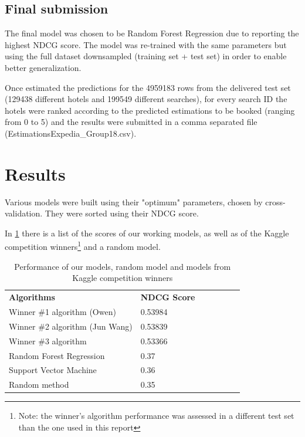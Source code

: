\documentclass[9pt]{llncs}
\begin{document}
\subsection{Final submission}
The final model was chosen to be Random Forest Regression due to reporting the highest NDCG score. The model was re-trained with the same parameters but using the full dataset downsampled (training set + test set) in order to enable better generalization.


Once estimated the predictions for the 4959183 rows from the delivered test set (129438 different hotels and 199549 different searches), for every search ID the hotels were ranked according to the predicted estimations to be booked (ranging from 0 to 5) and the results were submitted in a comma separated file (EstimationsExpedia\_Group18.csv).

\section{Results}
Various models were built using their "optimum" parameters, chosen by cross-validation. They were sorted using their NDCG score.

In \ref{table_results} there is a list of the scores of our working models, as well as of the Kaggle competition winners\footnote{Note: the winner's algorithm performance was assessed in a different test set than the one used in this report} and a random model.


\begin{table}
\centering
\caption[lala]{Performance of our models, random model and models from Kaggle competition winners\footnotemark[1]}
\begin{tabular}{lllllll}
\hline\noalign{\smallskip}
\textbf{Algorithms} & \textbf{NDCG Score} \\
\noalign{\smallskip}
\hline
\noalign{\smallskip}
Winner $\#$1 algorithm (Owen) \cite{ExpediaHttps://www.kaggle.com/c/expedia-personalized-sort/discussion/6203}& 0.53984\\
Winner $\#$2 algorithm (Jun Wang) \cite{ExpediaHttps://www.kaggle.com/c/expedia-personalized-sort/discussion/6203}& 0.53839\\
Winner $\#$3 algorithm \cite{ExpediaHttps://www.kaggle.com/c/expedia-personalized-sort/discussion/6203} & 0.53366\\
Random Forest Regression & 0.37\\
Support Vector Machine  & 0.36\\
Random method \cite{AgarwalLearnQueries} & 0.35\\
\hline
\end{tabular}
\label{table_results}
\end{table}
\end{document}
